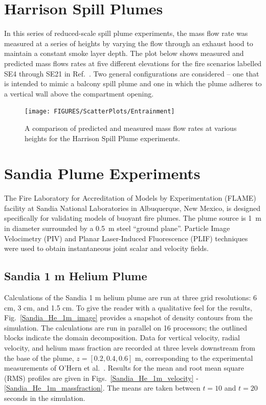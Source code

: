 \clearpage

\section{Harrison Spill Plumes}
\label{Harrison_Spill_Plumes}

In this series of reduced-scale spill plume experiments, the mass flow rate was measured at a series of heights by varying the flow through an exhaust hood to maintain a constant smoke layer depth.  The plot below shows measured and predicted mass flows rates at five different elevations for the fire scenarios labelled SE4 through SE21 in Ref.~\cite{Harrison:2009}. Two general configurations are considered -- one that is intended to mimic a balcony spill plume and one in which the plume adheres to a vertical wall above the compartment opening.

\begin{figure}[h]
\begin{center}
\texttt{[image: FIGURES/ScatterPlots/Entrainment]}
\caption[Summary of plume entrainment predictions]{A comparison of predicted and measured mass flow rates at various heights for the Harrison Spill Plume experiments.}
\label{Entrainment}
\end{center}
\end{figure}




\clearpage

\section{Sandia Plume Experiments}

The Fire Laboratory for Accreditation of Models by Experimentation (FLAME) facility \cite{OHern:2005,Blanchat:2001} at Sandia National Laboratories in Albuquerque, New Mexico, is designed specifically for validating models of buoyant fire plumes.  The plume source is 1~m in diameter surrounded by a 0.5~m steel ``ground plane''. Particle Image Velocimetry (PIV) and Planar Laser-Induced Fluorescence (PLIF) techniques were used to obtain instantaneous joint scalar and velocity fields.

\subsection{Sandia 1 m Helium Plume}
\label{Sandia plume}

Calculations of the Sandia 1 m helium plume are run at three grid resolutions: 6 cm, 3 cm, and 1.5 cm.  To give the reader with a qualitative feel for the results, Fig.~\ref{Sandia_He_1m_image} provides a snapshot of density contours from the simulation. The calculations are run in parallel on 16 processors; the outlined blocks indicate the domain decomposition.  Data for vertical velocity, radial velocity, and helium mass fraction are recorded at three levels downstream from the base of the plume, $z = [0.2, 0.4, 0.6]$ m, corresponding to the experimental measurements of O'Hern et al.~\cite{OHern:2005}.  Results for the mean and root mean square (RMS) profiles are given in Figs.~\ref{Sandia_He_1m_velocity} - \ref{Sandia_He_1m_massfraction}.  The means are taken between $t=10$ and $t=20$ seconds in the simulation.

